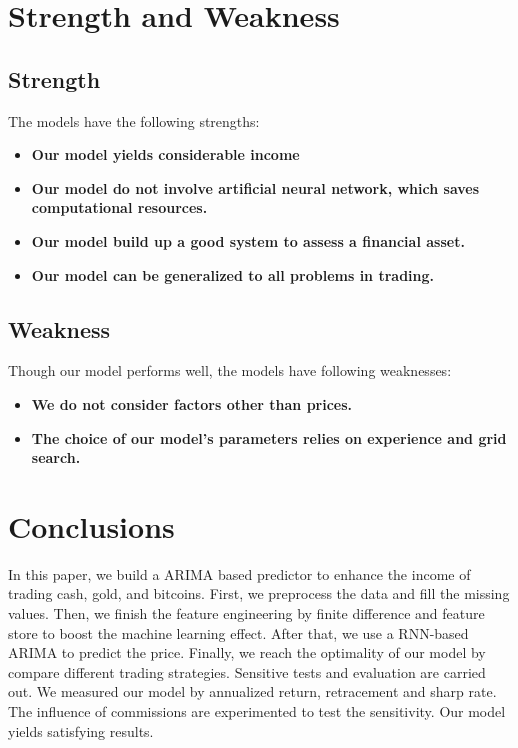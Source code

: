 \documentclass[12pt,a4paper]{article}
\newcommand{\Predictor}{ARIMA }
\begin{document}
\begin{spacing}{1.2}
\section{Strength and Weakness}
\label{Strength_Weakness}


\subsection{Strength}

The models have the following strengths:

\begin{itemize}
\item \textbf{Our model yields considerable income}

\item \textbf{Our model do not involve artificial neural network, which saves computational resources.}

\item \textbf{Our model build up a good system to assess a financial asset.}

\item \textbf{Our model can be generalized to all problems in trading.}

\end{itemize}


\subsection{Weakness}

Though our model performs well, the models have following weaknesses:

\begin{itemize}
\item \textbf{We do not consider factors other than prices.}

\item \textbf{The choice of our model's parameters relies on experience and grid search.}
\end{itemize}


\section{Conclusions}
\label{Conclusions}

In this paper, we build a \Predictor based predictor to enhance the income of trading cash, gold, and bitcoins. First, we preprocess the data and fill the missing values. Then, we finish the feature engineering by finite difference and feature store to boost the machine learning effect. After that, we use a RNN-based \Predictor to predict the price. Finally, we reach the optimality of our model by compare different trading strategies. Sensitive tests and evaluation are carried out. We measured our model by annualized return, retracement and sharp rate. The influence of commissions are experimented to test the sensitivity. Our model yields satisfying results.





\end{spacing}
\end{document}
